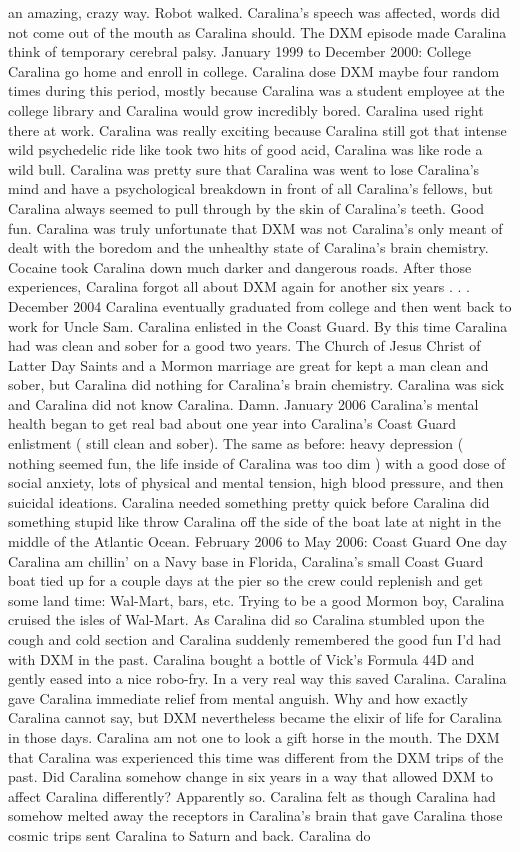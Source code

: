 \documentclass[12pt]{book}
\begin{document}
an amazing, crazy way. Robot walked. Caralina's speech was affected, words did not come out of the mouth as Caralina should. The DXM episode made Caralina think of temporary cerebral palsy. January 1999 to December 2000: College Caralina go home and enroll in college. Caralina dose DXM maybe four random times during this period, mostly because Caralina was a student employee at the college library and Caralina would grow incredibly bored. Caralina used right there at work. Caralina was really exciting because Caralina still got that intense wild psychedelic ride like took two hits of good acid, Caralina was like rode a wild bull. Caralina was pretty sure that Caralina was went to lose Caralina's mind and have a psychological breakdown in front of all Caralina's fellows, but Caralina always seemed to pull through by the skin of Caralina's teeth. Good fun. Caralina was truly unfortunate that DXM was not Caralina's only meant of dealt with the boredom and the unhealthy state of Caralina's brain chemistry. Cocaine took Caralina down much darker and dangerous roads. After those experiences, Caralina forgot all about DXM again for another six years . . .  December 2004 Caralina eventually graduated from college and then went back to work for Uncle Sam. Caralina enlisted in the Coast Guard. By this time Caralina had was clean and sober for a good two years. The Church of Jesus Christ of Latter Day Saints and a Mormon marriage are great for kept a man clean and sober, but Caralina did nothing for Caralina's brain chemistry. Caralina was sick and Caralina did not know Caralina. Damn. January 2006 Caralina's mental health began to get real bad about one year into Caralina's Coast Guard enlistment ( still clean and sober). The same as before: heavy depression ( nothing seemed fun, the life inside of Caralina was too dim ) with a good dose of social anxiety, lots of physical and mental tension, high blood pressure, and then suicidal ideations. Caralina needed something pretty quick before Caralina did something stupid like throw Caralina off the side of the boat late at night in the middle of the Atlantic Ocean. February 2006 to May 2006: Coast Guard One day Caralina am chillin' on a Navy base in Florida, Caralina's small Coast Guard boat tied up for a couple days at the pier so the crew could replenish and get some land time: Wal-Mart, bars, etc. Trying to be a good Mormon boy, Caralina cruised the isles of Wal-Mart. As Caralina did so Caralina stumbled upon the cough and cold section and Caralina suddenly remembered the good fun I'd had with DXM in the past. Caralina bought a bottle of Vick's Formula 44D and gently eased into a nice robo-fry. In a very real way this saved Caralina. Caralina gave Caralina immediate relief from mental anguish. Why and how exactly Caralina cannot say, but DXM nevertheless became the elixir of life for Caralina in those days. Caralina am not one to look a gift horse in the mouth. The DXM that Caralina was experienced this time was different from the DXM trips of the past. Did Caralina somehow change in six years in a way that allowed DXM to affect Caralina differently? Apparently so. Caralina felt as though Caralina had somehow melted away the receptors in Caralina's brain that gave Caralina those cosmic trips sent Caralina to Saturn and back. Caralina do 
\end{document}
